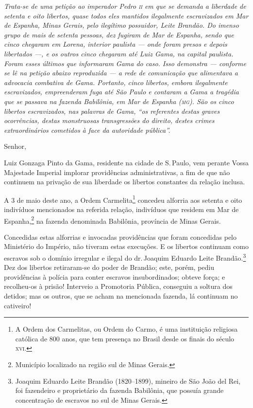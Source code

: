 {\begin{resumo}
\emph{Trata-se de uma petição ao imperador Pedro \textsc{ii} em que se demanda a
liberdade de setenta e oito libertos, quase todos eles mantidos
ilegalmente escravizados em Mar de Espanha, Minas Gerais, pelo ilegítimo
possuidor, Leite Brandão. Do imenso grupo de mais de setenta pessoas,
dez fugiram de Mar de Espanha, sendo que cinco chegaram em Lorena,
interior paulista --- onde foram presos e depois libertados ---, e os
outros cinco chegaram até Luiz Gama, na capital paulista. Foram esses
últimos que informaram Gama do caso. Isso demonstra --- conforme se lê na
petição abaixo reproduzida --- a rede de comunicação que alimentava a
advocacia combativa de Gama. Portanto, cinco libertos, embora
ilegalmente escravizados, empreenderam fuga até São Paulo e contaram a
Gama a tragédia que se passava na fazenda Babilônia, em Mar de Espanha
(\textsc{mg}). São os cinco libertos
escravizados, nas palavras de Gama, ``os referentes destas graves ocorrências, destas
monstruosas transgressões do direito, destes crimes extraordinários
cometidos à face da autoridade pública''. }
\end{resumo}\pagebreak

Senhor,

Luiz Gonzaga Pinto da Gama, residente na cidade de S.\,Paulo, vem perante
Vossa Majestade Imperial implorar providências administrativas, a fim de
que não continuem na privação de sua liberdade os libertos constantes da
relação inclusa.

A 3 de maio deste ano, a Ordem Carmelita\footnote{A Ordem dos
  Carmelitas, ou Ordem do Carmo, é uma instituição religiosa católica de
  800 anos, que tem presença no Brasil desde os finais do século \textsc{xvi}.}
concedeu alforria aos setenta e oito indivíduos mencionados na referida
relação, indivíduos que residem em Mar de Espanha,\footnote{Município
  localizado na região sul de Minas Gerais.} na fazenda denominada
Babilônia, província de Minas Gerais.

Concedidas estas alforrias e invocadas providências que foram concedidas
pelo Ministério do Império, não tiveram estas execuções. E os libertos
continuam como escravos sob o domínio irregular e ilegal do dr.\,Joaquim
Eduardo Leite Brandão.\footnote{Joaquim Eduardo Leite Brandão
  (1820--1899), mineiro de São João del Rei, foi fazendeiro e
  proprietário da fazenda Babilônia, que possuía grande concentração de
  escravos no sul de Minas Gerais.} Dez dos libertos retiraram-se do
poder de Brandão; este, porém, pediu providências à polícia para conter
escravos insubordinados; obteve força; e recolheu-os à prisão! Interveio
a Promotoria Pública, conseguiu a soltura dos detidos; mas os outros,
que se acham na mencionada fazenda, lá continuam no cativeiro!

}
